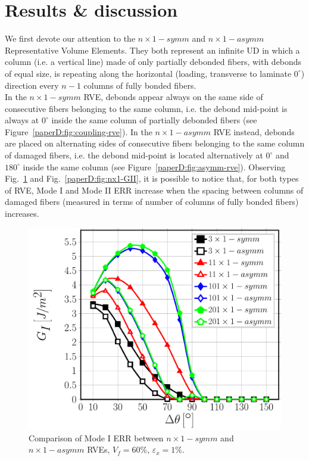 
\section{Results \& discussion}

We first devote our attention to the $n \times 1-symm$ and $n \times 1-asymm$ Representative Volume Elements. They both represent an infinite UD in which a column (i.e. a vertical line) made of only partially debonded fibers, with debonds of equal size, is repeating along the horizontal (loading, transverse to laminate $0^{\circ}$) direction every $n-1$ columns of fully bonded fibers.\\
In the $n \times 1-symm$ RVE, debonds appear always on the same side of consecutive fibers belonging to the same column, i.e. the debond mid-point is always at $0^{\circ}$ inside the same column of partially debonded fibers (see Figure~\ref{paperD:fig:coupling-rve}). In the $n \times 1-asymm$ RVE instead, debonds are placed on alternating sides of consecutive fibers belonging to the same column of damaged fibers, i.e. the debond mid-point is located alternatively at $0^{\circ}$ and $180^{\circ}$ inside the same column (see Figure~\ref{paperD:fig:asymm-rve}). Observing Fig.~\ref{paperD:fig:nx1-GI} and Fig.~\ref{paperD:fig:nx1-GII}, it is possible to notice that, for both types of RVE, Mode I and Mode II ERR increase when the spacing between columns of damaged fibers (measured in terms of number of columns of fully bonded fibers) increases.

\begin{figure}[!htb]
\centering
  \includegraphics[width=\textwidth]{paperD/nx1-coupling-vf60-GI.pdf}
\caption{Comparison of Mode I ERR between $n \times 1-symm$ and $n \times 1-asymm$ RVEs, $V_{f}=60\%$, $\varepsilon_{x}=1\%$.}\label{paperD:fig:nx1-GI}
\end{figure}

